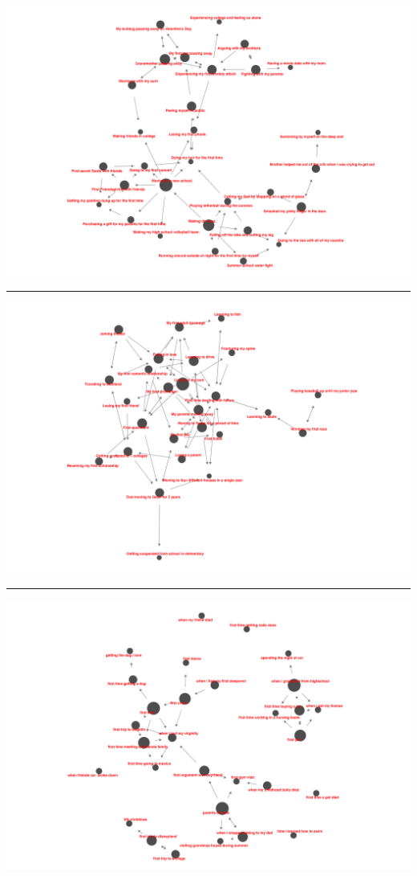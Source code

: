 \documentclass[
  .7em,
  letterpaper,
  DIV=11,
  numbers=noendperiod]{scrartcl}
\begin{document}
\includegraphics{images/60260_net.png}

\begin{center}\rule{0.5\linewidth}{0.5pt}\end{center}

\includegraphics{images/60571_net.png}

\begin{center}\rule{0.5\linewidth}{0.5pt}\end{center}

\includegraphics{images/60572_net.png}
\end{document}
